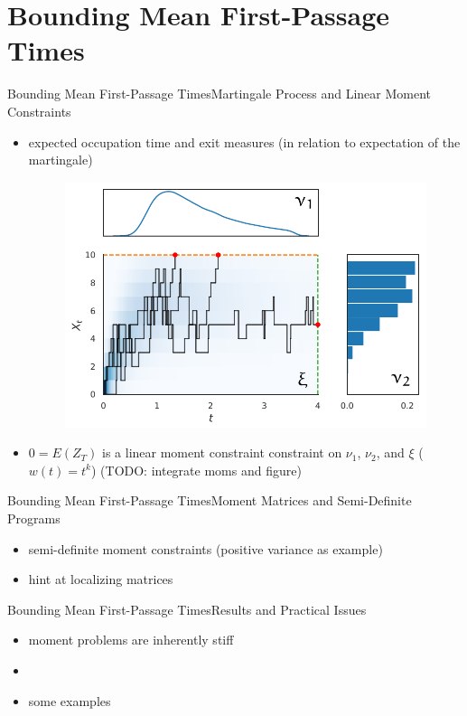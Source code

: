 \documentclass{beamer}
\newcommand{\expSym}{{E}}
\newcommand{\E}[1]{\ensuremath{\expSym\left(#1\right)}}
\newcommand{\bottomcite}[1]{\vspace*{\fill} {\scriptsize \parencite{#1}}}
\begin{document}
\section{Bounding Mean First-Passage Times}
\begin{frame}{Bounding Mean First-Passage Times}{Martingale Process and Linear Moment Constraints}
  \begin{itemize}
      \item expected occupation time and exit measures (in relation to expectation of the martingale)
    \begin{figure}
        \centering
        \includegraphics[scale=.4]{../gfx/decomp1.pdf}
    \end{figure}
    \item $0=\E{ Z_T }$ is a linear moment constraint constraint on $\nu_1$, $\nu_2$, and $\xi$ ($w(t)=t^k$) (TODO: integrate moms and figure)
  \end{itemize}

\bottomcite{backenkohler2019bounding}
\end{frame}

\begin{frame}{Bounding Mean First-Passage Times}{Moment Matrices and Semi-Definite Programs}
  \begin{itemize}
    \item semi-definite moment constraints (positive variance as example)
    \item hint at localizing matrices
  \end{itemize}
\bottomcite{backenkohler2019bounding}
\end{frame}

\begin{frame}{Bounding Mean First-Passage Times}{Results and Practical Issues}
  \begin{itemize}
    \item moment problems are inherently stiff
    \item 
    \item some examples
  \end{itemize}
\bottomcite{backenkohler2019bounding}
\end{frame}
\end{document}
